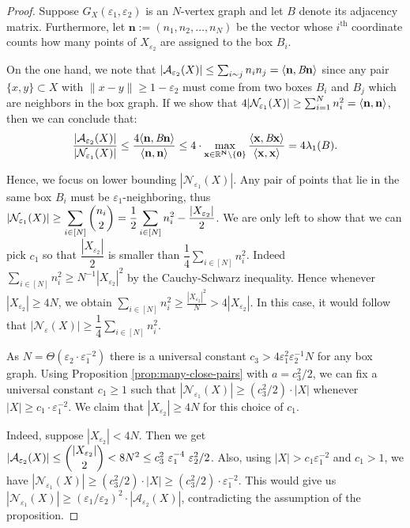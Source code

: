 \documentclass[12pt]{article}
\newcommand{\eps}{\varepsilon}
\begin{document}
\begin{proof}
 Suppose $G_X(\eps_1,\eps_2)$ is an $N$-vertex graph and let $B$ denote its adjacency matrix. Furthermore, let $\mathbf{n}:=(n_1,n_2,\ldots,n_N)$ be the vector whose $i^{\text{th}}$ coordinate counts how many points of $X_{\eps_2}$ are assigned to the box $B_i$.
    
On the one hand, we note that $|\mathcal{A}_{\eps_2}(X)|\leq \sum_{i\sim j}n_in_j=\langle\bf{n},\emph{B}\bf{n}\rangle$  since any pair $\{x,y\}\subset X$ with $\|x-y\|\geq 1-\eps_2$ must come from two boxes $B_i$ and $B_j$ which are neighbors in the box graph. If we show that $4|\mathcal{N}_{\eps_1}(X)|\geq \sum_{i=1}^Nn_i^2=\langle\bf{n},\bf{n}\rangle$, then we can conclude that:
    $$\dfrac{|\mathcal{A}_{\eps_2}(X)|}{|\mathcal{N}_{\eps_1}(X)|}\leq \dfrac{4\langle\bf{n},\emph{B}\bf{n}\rangle}{\langle\bf{n},\bf{n}\rangle}\leq 4\cdot \max_{\bf{x}\in\mathbb{R}^N\setminus\{0\}}\dfrac{\langle\bf{x},\emph{B}\bf{x}\rangle}{\langle\bf{x},\bf{x}\rangle}=4\lambda_1(B).$$


Hence, we focus on lower bounding $|\mathcal{N}_{\eps_1}(X)|$. Any pair of points that lie in the same box $B_i$ must be $\eps_1$-neighboring, thus  
$|\mathcal{N}_{\eps_1}(X)|\geq \displaystyle\sum_{i\in [N]}\dbinom{n_i}{2}= \dfrac{1}{2}\displaystyle\sum_{i\in [N]}n_i^2 - \dfrac{|X_{\eps_2}|}{2}$. We are only left to show that we can pick $c_1$ so that $\dfrac{|X_{\eps_2}|}{2}$ is smaller than $ \dfrac{1}{4}\displaystyle\sum_{i\in [N]}n_i^2$.
Indeed $\displaystyle\sum_{i\in[N]} n_i^2\geq N^{-1}|X_{\eps_2}|^2 $ by the Cauchy-Schwarz inequality. Hence  whenever $|X_{\eps_2}|\geq 4N$, we obtain  $\displaystyle\sum_{i\in[N]} n_i^2\geq\frac{|X_{\eps_2}|^2}{N}>4|X_{\eps_2}|$. 
In this case, it would follow that $|\mathcal{N}_\eps(X)|\geq \dfrac{1}{4}\displaystyle\sum_{i\in [N]}n_i^2$.


As $N=\Theta \left(\varepsilon_2\cdot\varepsilon_1^{-2}\right)$ there is a universal constant $c_3>4\eps_1^2\eps_2^{-1}N$ for any box graph. Using Proposition \ref{prop:many-close-pairs} with $a=c_3^2/2$, we can fix a universal constant $c_1\ge1$ such that  $|\mathcal{N}_{\eps_1}(X)|\geq (c_3^2/2)\cdot|X|$ whenever $|X|\geq c_1\cdot \eps_1^{-2}$. We claim that $|X_{\eps_2}|\geq 4N$ for this choice of $c_1$.

 Indeed, suppose $|X_{\eps_2}|<4N$. Then we get
$\left|\mathcal{A}_{\eps_2}(X)\right|\leq \dbinom{|X_{\eps_2}|}{2}<8N^2\le c_3^{2\ }\eps_1^{-4\ }\eps_2^{2}/2$. Also, using $|X|>c_1\eps_1^{-2}$ and $c_1>1$, we have  $|\mathcal{N}_{\eps_1}(X)|\geq (c_3^2/2)\cdot|X|\ge(c_3^2/2)\cdot\eps_1^{-2}$.
 This would give us $|\mathcal{N}_{\eps_1}(X)|\geq (\eps_1/\eps_2)^2\cdot|\mathcal{A}_{\eps_2}(X)|$, contradicting the assumption of the proposition. 
\end{proof}
 
\end{document}

